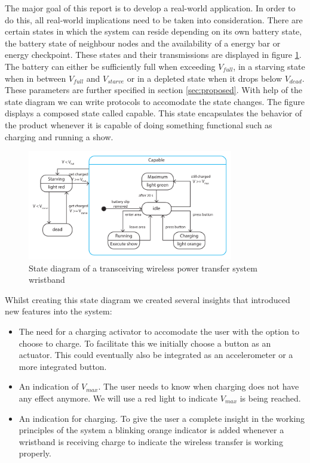 %
The major goal of this report is to develop a real-world application. In order to do this, all real-world implications need to be taken into consideration. There are certain states in which the system can reside depending on its own battery state, the battery state of neighbour nodes and the availability of a energy bar or energy checkpoint. These states and their transmissions are displayed in figure \ref{fig:states}. The battery can either be sufficiently full when exceeding $V_{full}$, in a starving state when in between $V_{full}$ and $V_{starve}$ or in a depleted state when it drops below $V_{dead}$. These parameters are further specified in section \ref{sec:proposed}. With help of the state diagram we can write protocols to accomodate the state changes. The figure displays a composed state called capable. This state encapsulates the behavior of the product whenever it is capable of doing something functional such as charging and running a show. 

\begin{figure}[h!]
\centering
\includegraphics[width=0.8\textwidth]{statediagram.pdf}
\caption{State diagram of a transceiving wireless power transfer system wristband}
\label{fig:states}
\end{figure}

Whilst creating this state diagram we created several insights that introduced new features into the system:
\begin{itemize}
	\item The need for a charging activator to accomodate the user with the option to choose to charge. To facilitate this we initially choose a button as an actuator. This could eventually also be integrated as an accelerometer or a more integrated button. 
	\item An indication of $V_{max}$. The user needs to know when charging does not have any effect anymore. We will use a red light to indicate $V_{max}$ is being reached. 
	\item An indication for charging. To give the user a complete insight in the working principles of the system a blinking orange indicator is added whenever a wristband is receiving charge to indicate the wireless transfer is working properly. 
\end{itemize}

